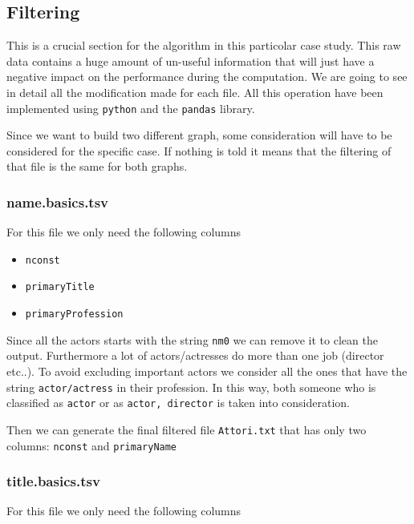 \newpage
\subsection{Filtering} \label{filtering}

This is a crucial section for the algorithm in this particolar case study. This raw data contains a huge amount of un-useful information that will just have a negative impact on the performance during the computation. We are going to see in detail all the modification made for each file. All this operation have been implemented using \texttt{python} and the \texttt{pandas} library. \s

Since we want to build two different graph, some consideration will have to be considered for the specific case. If nothing is told it means that the filtering of that file is the same for both graphs.

\subsubsection{name.basics.tsv}

For this file we only need the following columns

\begin{itemize}
    \item \texttt{nconst}
    \item \texttt{primaryTitle}
    \item \texttt{primaryProfession}
\end{itemize}
Since all the actors starts with the string \texttt{nm0} we can remove it to clean the output. Furthermore a lot of actors/actresses do more than one job (director etc..). To avoid excluding important actors we consider all the ones that have the string \texttt{actor/actress} in their profession. In this way, both someone who is classified as \texttt{actor} or as \texttt{actor, director} is taken into consideration. \s

\noindent Then we can generate the final filtered file \texttt{Attori.txt} that has only two columns: \texttt{nconst} and \texttt{primaryName}


\subsubsection{title.basics.tsv}

For this file we only need the following columns

